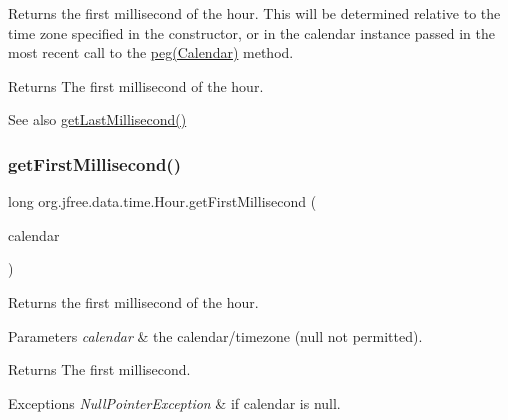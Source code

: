 Returns the first millisecond of the hour. This will be determined relative to the time zone specified in the constructor, or in the calendar instance passed in the most recent call to the \mbox{\hyperlink{classorg_1_1jfree_1_1data_1_1time_1_1_hour_af4edfe009983a54b3747e191fcdb59e6}{peg(\+Calendar)}} method.

\begin{DoxyReturn}{Returns}
The first millisecond of the hour.
\end{DoxyReturn}
\begin{DoxySeeAlso}{See also}
\mbox{\hyperlink{classorg_1_1jfree_1_1data_1_1time_1_1_hour_af4e68aff2d3a8379ec6f61ce3911f3ae}{get\+Last\+Millisecond()}} 
\end{DoxySeeAlso}
\mbox{\label{classorg_1_1jfree_1_1data_1_1time_1_1_hour_ab29f2b42dba98c1b4ee2969b35c2b7d4}} 
\subsubsection{\texorpdfstring{get\+First\+Millisecond()}{getFirstMillisecond()}\hspace{0.1cm}{\footnotesize\ttfamily [2/2]}}
{\footnotesize\ttfamily long org.\+jfree.\+data.\+time.\+Hour.\+get\+First\+Millisecond (\begin{DoxyParamCaption}\item[{Calendar}]{calendar }\end{DoxyParamCaption})}

Returns the first millisecond of the hour.


\begin{DoxyParams}{Parameters}
{\em calendar} & the calendar/timezone ({\ttfamily null} not permitted).\\
\hline
\end{DoxyParams}
\begin{DoxyReturn}{Returns}
The first millisecond.
\end{DoxyReturn}

\begin{DoxyExceptions}{Exceptions}
{\em Null\+Pointer\+Exception} & if {\ttfamily calendar} is {\ttfamily null}. \\
\hline
\end{DoxyExceptions}
\mbox{\label{classorg_1_1jfree_1_1data_1_1time_1_1_hour_ab93b3e87c51ed54b7f916722c1473800}} 
